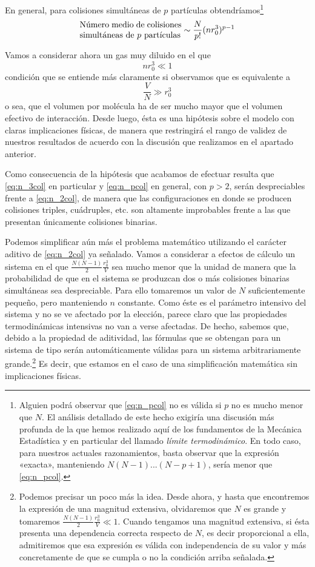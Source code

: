 En general, para colisiones simultáneas de $p$ partículas obtendríamos\footnote{Alguien podrá observar que \eqref{eq:n_pcol} no es válida si $p$ no es mucho menor que $N$. El análisis detallado de este hecho exigiría una discusión más profunda de la que hemos realizado aquí de los fundamentos de la Mecánica Estadística y en particular del llamado \emph{límite termodinámico}. En todo caso, para nuestros actuales razonamientos, basta observar que la expresión «exacta», manteniendo $N(N - 1) ... (N - p + 1)$, sería menor que \eqref{eq:n_pcol}.}
\begin{equation}\label{eq:n_pcol}
	\parbox{12em}{Número medio de colisiones\\simultáneas de $p$ partículas} \sim  \frac{N}{p!}(nr_0^3)^{p-1}
\end{equation}

Vamos a considerar ahora un gas muy diluido en el que
$$nr_0^3 \ll 1$$
condición que se entiende más claramente si observamos que es equivalente a
$$\frac{V}{N} \gg r_0^3$$
o sea, que el volumen por molécula ha de ser mucho mayor que el volumen efectivo de interacción.
Desde luego, ésta es una hipótesis sobre el modelo con claras implicaciones físicas, de manera que restringirá el rango de validez de nuestros resultados de acuerdo con la discusión que realizamos en el apartado anterior.

Como consecuencia de la hipótesis que acabamos de efectuar resulta que \eqref{eq:n_3col} en particular y \eqref{eq:n_pcol} en general, con $p > 2$, serán despreciables frente a \eqref{eq:n_2col}, de manera que las configuraciones en donde se producen colisiones triples, cuádruples, etc. son altamente improbables frente a las que presentan únicamente colisiones binarias.

Podemos simplificar aún más el problema matemático utilizando el carácter aditivo de \eqref{eq:n_2col} ya señalado.
Vamos a considerar a efectos de cálculo un sistema en el que $\frac{N ( N - 1)}{2}\frac{r_0^3}{V}$ sea mucho menor que la unidad de manera que la probabilidad de que en el sistema se produzcan dos o más colisiones binarias simultáneas sea despreciable.
Para ello tomaremos un valor de $N$ suficientemente pequeño, pero manteniendo $n$ constante.
Como éste es el parámetro intensivo del sistema y no se ve afectado por la elección, parece claro que las propiedades termodinámicas intensivas no van a verse afectadas.
De hecho, sabemos que, debido a la propiedad de aditividad, las fórmulas que se obtengan para un sistema de tipo serán automáticamente válidas para un sistema arbitrariamente grande.\footnote{Podemos precisar un poco más la idea. Desde ahora, y hasta que encontremos la expresión de una magnitud extensiva, olvidaremos que $N$ es grande y tomaremos $\frac{N ( N - 1)}{2}\frac{r_0^3}{V} \ll 1$. Cuando tengamos una magnitud extensiva, si ésta presenta una dependencia correcta respecto de $N$, es decir proporcional a ella, admitiremos que esa expresión es válida con independencia de su valor y más concretamente de que se cumpla o no la condición arriba señalada.}
Es decir, que estamos en el caso de una simplificación matemática sin implicaciones físicas.

